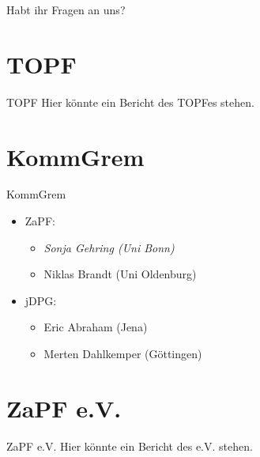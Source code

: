 \documentclass[compress, aspectratio=169]{beamer}
\begin{document}
\begin{frame}[plain]
  \begin{center}
    \Huge Habt ihr Fragen an uns?
    \end{center}
\end{frame}

\section{TOPF}
\begin{frame}{TOPF}
Hier könnte ein Bericht des TOPFes stehen.
\end{frame}

\section{KommGrem}

\begin{frame}{KommGrem}
  \begin{itemize}
  \item[] ZaPF:
    \begin{itemize}
    \item \emph{Sonja Gehring (Uni Bonn)}
    \item Niklas Brandt (Uni Oldenburg)
    \end{itemize}
  \item[] jDPG:
    \begin{itemize}
    \item Eric Abraham (Jena)
    \item Merten Dahlkemper (Göttingen)
    \end{itemize}
  \end{itemize}
  \vspace{0.5cm}
\end{frame}


\section{ZaPF e.V.}

\begin{frame}{ZaPF e.V.}
Hier könnte ein Bericht des e.V. stehen.
\end{frame} 
\end{document}
